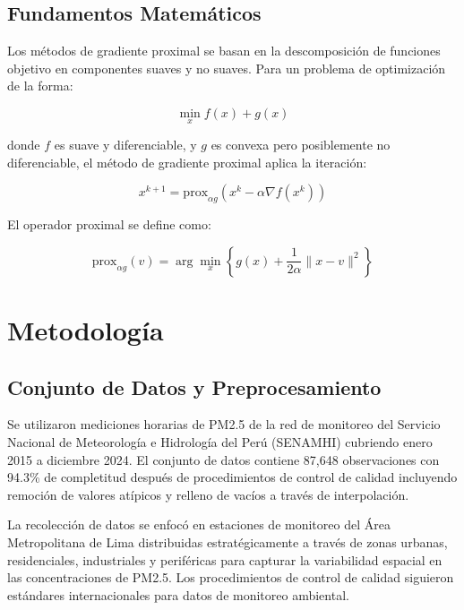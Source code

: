 \documentclass[conference]{IEEEtran}
\begin{document}
\subsection{Fundamentos Matemáticos}

Los métodos de gradiente proximal se basan en la descomposición de funciones objetivo en componentes suaves y no suaves. Para un problema de optimización de la forma:

\begin{equation}
\min_{x} f(x) + g(x)
\end{equation}

donde $f$ es suave y diferenciable, y $g$ es convexa pero posiblemente no diferenciable, el método de gradiente proximal aplica la iteración:

\begin{equation}
x^{k+1} = \text{prox}_{\alpha g}(x^k - \alpha \nabla f(x^k))
\end{equation}

El operador proximal se define como:

\begin{equation}
\text{prox}_{\alpha g}(v) = \arg\min_x \left\{ g(x) + \frac{1}{2\alpha} \|x - v\|^2 \right\}
\end{equation}

\section{Metodología}

\subsection{Conjunto de Datos y Preprocesamiento}

Se utilizaron mediciones horarias de PM2.5 de la red de monitoreo del Servicio Nacional de Meteorología e Hidrología del Perú (SENAMHI) cubriendo enero 2015 a diciembre 2024. El conjunto de datos contiene 87,648 observaciones con 94.3\% de completitud después de procedimientos de control de calidad incluyendo remoción de valores atípicos y relleno de vacíos a través de interpolación.

La recolección de datos se enfocó en estaciones de monitoreo del Área Metropolitana de Lima distribuidas estratégicamente a través de zonas urbanas, residenciales, industriales y periféricas para capturar la variabilidad espacial en las concentraciones de PM2.5. Los procedimientos de control de calidad siguieron estándares internacionales para datos de monitoreo ambiental.
\end{document}
